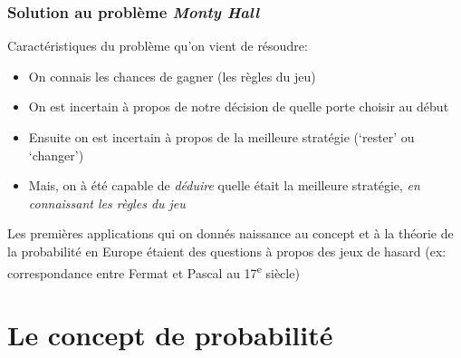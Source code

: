 \documentclass{beamer}
\begin{document}
\begin{frame}
    \frametitle{Solution au problème \emph{Monty Hall}}
    Caractéristiques du problème qu’on vient de résoudre: \pause
    \begin{itemize}
      \item On connais les chances de gagner (les règles du jeu) \pause
      \item On est incertain à propos de notre décision de quelle porte choisir au début  \pause
      \item Ensuite on est incertain à propos de la meilleure stratégie (‘rester’ ou ‘changer’)  \pause
      \item Mais, on à été capable de \emph{déduire} quelle était la meilleure stratégie,
            \emph{en connaissant les règles du jeu}
    \end{itemize}

    \vfill \pause

    Les premières applications qui on donnés naissance au concept et
    à la théorie de la probabilité en Europe étaient des questions à propos
    des jeux de hasard (ex: correspondance entre Fermat et Pascal au 17\textsuperscript{e} siècle)
\end{frame}



\section{Le concept de probabilité}
\end{document}

